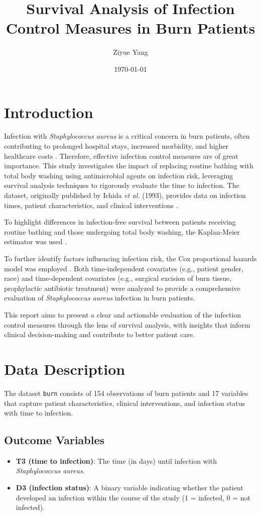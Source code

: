 \documentclass[12pt]{article}
\title{Survival Analysis of Infection Control Measures in Burn Patients}
\author{Ziyue Yang}
\date{\today}
\begin{document}
\maketitle

\section*{Introduction}

Infection with \textit{Staphylococcus aureus} is a critical concern in burn patients, often contributing to prolonged hospital stays, increased morbidity, and higher healthcare costs \cite{norbury_infection_2016}. Therefore, effective infection control measures are of great importance. This study investigates the impact of replacing routine bathing with total body washing using antimicrobial agents on infection risk, leveraging survival analysis techniques to rigorously evaluate the time to infection. The dataset, originally published by Ichida \textit{et al.} (1993), provides data on infection times, patient characteristics, and clinical interventions \cite{ichida_evaluation_1993}.

To highlight differences in infection-free survival between patients receiving routine bathing and those undergoing total body washing, the Kaplan-Meier estimator was used \cite{kaplan_nonparametric_1958}. 

To further identify factors influencing infection risk, the Cox proportional hazards model was employed \cite{cox1972}. Both time-independent covariates (e.g., patient gender, race) and time-dependent covariates (e.g., surgical excision of burn tissue, prophylactic antibiotic treatment) were analyzed to provide a comprehensive evaluation of \textit{Staphylococcus aureus} infection in burn patients.

This report aims to present a clear and actionable evaluation of the infection control measures through the lens of survival analysis, with insights that inform clinical decision-making and contribute to better patient care.


\section*{Data Description}

The dataset \texttt{burn} consists of 154 observations of burn patients and 17 variables that capture patient characteristics, clinical interventions, and infection status with time to infection.  

\subsection*{Outcome Variables}
\begin{itemize}
    \item \textbf{T3 (time to infection)}: The time (in days) until infection with \textit{Staphylococcus aureus}.
    \item \textbf{D3 (infection status)}: A binary variable indicating whether the patient developed an infection within the course of the study (1 = infected, 0 = not infected).
\end{itemize}
\end{document}
